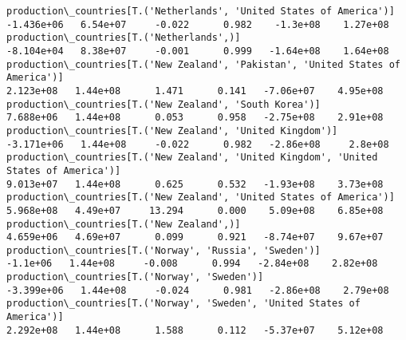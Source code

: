\documentclass[11pt]{article}
\begin{document}
\begin{Verbatim}[commandchars=\\\{\}]
production\_countries[T.('Netherlands', 'United States of America')]                                                                                                                   -1.436e+06   6.54e+07     -0.022      0.982    -1.3e+08    1.27e+08
production\_countries[T.('Netherlands',)]                                                                                                                                              -8.104e+04   8.38e+07     -0.001      0.999   -1.64e+08    1.64e+08
production\_countries[T.('New Zealand', 'Pakistan', 'United States of America')]                                                                                                        2.123e+08   1.44e+08      1.471      0.141   -7.06e+07    4.95e+08
production\_countries[T.('New Zealand', 'South Korea')]                                                                                                                                 7.688e+06   1.44e+08      0.053      0.958   -2.75e+08    2.91e+08
production\_countries[T.('New Zealand', 'United Kingdom')]                                                                                                                             -3.171e+06   1.44e+08     -0.022      0.982   -2.86e+08     2.8e+08
production\_countries[T.('New Zealand', 'United Kingdom', 'United States of America')]                                                                                                  9.013e+07   1.44e+08      0.625      0.532   -1.93e+08    3.73e+08
production\_countries[T.('New Zealand', 'United States of America')]                                                                                                                    5.968e+08   4.49e+07     13.294      0.000    5.09e+08    6.85e+08
production\_countries[T.('New Zealand',)]                                                                                                                                               4.659e+06   4.69e+07      0.099      0.921   -8.74e+07    9.67e+07
production\_countries[T.('Norway', 'Russia', 'Sweden')]                                                                                                                                  -1.1e+06   1.44e+08     -0.008      0.994   -2.84e+08    2.82e+08
production\_countries[T.('Norway', 'Sweden')]                                                                                                                                          -3.399e+06   1.44e+08     -0.024      0.981   -2.86e+08    2.79e+08
production\_countries[T.('Norway', 'Sweden', 'United States of America')]                                                                                                               2.292e+08   1.44e+08      1.588      0.112   -5.37e+07    5.12e+08

\end{Verbatim}
\end{document}
